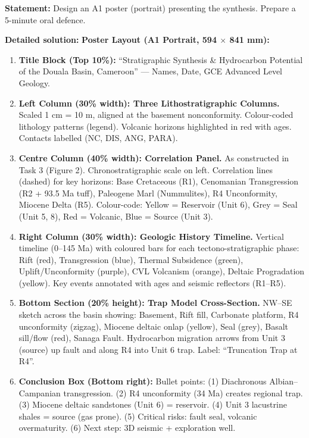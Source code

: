 \documentclass[11pt]{article}
\begin{document}
\begin{exoresolu}
\textbf{Statement:} Design an A1 poster (portrait) presenting the synthesis. Prepare a 5-minute oral defence.

\tcblower
\textbf{Detailed solution:}
\textbf{Poster Layout (A1 Portrait, 594 $\times$ 841 mm):}
\begin{enumerate}
    \item \textbf{Title Block (Top 10\%):} ``Stratigraphic Synthesis \& Hydrocarbon Potential of the Douala Basin, Cameroon'' --- Names, Date, GCE Advanced Level Geology.
    \item \textbf{Left Column (30\% width): Three Lithostratigraphic Columns.} Scaled 1 cm = 10 m, aligned at the basement nonconformity. Colour-coded lithology patterns (legend). Volcanic horizons highlighted in red with ages. Contacts labelled (NC, DIS, ANG, PARA).
    \item \textbf{Centre Column (40\% width): Correlation Panel.} As constructed in Task 3 (Figure 2). Chronostratigraphic scale on left. Correlation lines (dashed) for key horizons: Base Cretaceous (R1), Cenomanian Transgression (R2 + 93.5 Ma tuff), Paleogene Marl (Nummulites), R4 Unconformity, Miocene Delta (R5). Colour-code: Yellow = Reservoir (Unit 6), Grey = Seal (Unit 5, 8), Red = Volcanic, Blue = Source (Unit 3).
    \item \textbf{Right Column (30\% width): Geologic History Timeline.} Vertical timeline (0--145 Ma) with coloured bars for each tectono-stratigraphic phase: Rift (red), Transgression (blue), Thermal Subsidence (green), Uplift/Unconformity (purple), CVL Volcanism (orange), Deltaic Progradation (yellow). Key events annotated with ages and seismic reflectors (R1--R5).
    \item \textbf{Bottom Section (20\% height): Trap Model Cross-Section.} NW--SE sketch across the basin showing: Basement, Rift fill, Carbonate platform, R4 unconformity (zigzag), Miocene deltaic onlap (yellow), Seal (grey), Basalt sill/flow (red), Sanaga Fault. Hydrocarbon migration arrows from Unit 3 (source) up fault and along R4 into Unit 6 trap. Label: ``Truncation Trap at R4''.
    \item \textbf{Conclusion Box (Bottom right):} Bullet points: (1) Diachronous Albian--Campanian transgression. (2) R4 unconformity (34 Ma) creates regional trap. (3) Miocene deltaic sandstones (Unit 6) = reservoir. (4) Unit 3 lacustrine shales = source (gas prone). (5) Critical risks: fault seal, volcanic overmaturity. (6) Next step: 3D seismic + exploration well.
\end{enumerate}


\end{exoresolu}
\end{document}
